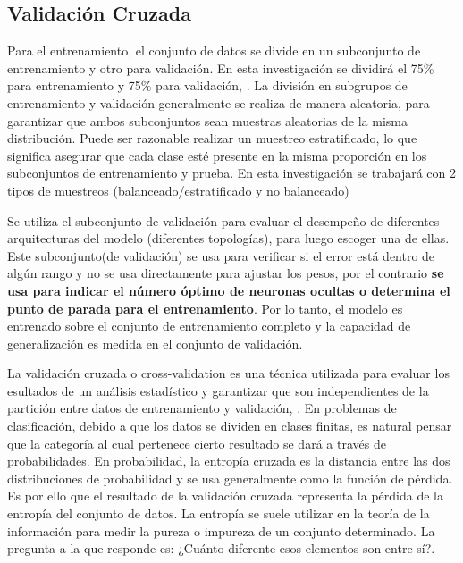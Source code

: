 	\subsection{Validación Cruzada}
	

		Para el entrenamiento, el conjunto de datos se divide en un subconjunto de entrenamiento y otro para validación. En esta investigación se dividirá el 75\% para entrenamiento y 75\% para validación, {\citep {Elkan12evaluatingclassifiers}}. La división en subgrupos de entrenamiento y validación generalmente se realiza de manera aleatoria, para garantizar que ambos subconjuntos sean muestras aleatorias de la misma distribución. Puede ser razonable realizar un muestreo estratificado, lo que significa asegurar que cada clase esté presente en la misma proporción en los subconjuntos de entrenamiento y prueba. En esta investigación se trabajará con 2 tipos de muestreos (balanceado/estratificado y no balanceado)

		Se utiliza el subconjunto de validación para evaluar el desempeño de diferentes arquitecturas del modelo (diferentes topologías), para luego escoger una de ellas. Este subconjunto(de validación) se usa para verificar si el error está dentro de algún rango y no se usa directamente para ajustar los pesos, por el contrario \textbf{se usa para indicar el número óptimo de neuronas ocultas o determina el punto de parada para el entrenamiento}.  Por lo tanto, el modelo es entrenado sobre el conjunto de entrenamiento completo y la capacidad de generalización es medida en el conjunto de validación. 

		La validación cruzada o cross-validation es una técnica utilizada para evaluar los esultados de un análisis estadístico y garantizar que son independientes de la partición entre datos de entrenamiento y validación, \citep{moore2001cross}. En problemas de clasificación, debido a que los datos se dividen en clases finitas, es natural pensar que la categoría al cual pertenece cierto resultado se dará a través de probabilidades. En probabilidad, la entropía cruzada es la distancia entre las dos distribuciones de probabilidad y se usa generalmente como la función de pérdida. Es por ello que el resultado de la validación cruzada representa la pérdida de la entropía del conjunto de datos. La entropía se suele utilizar en la teoría de la información para medir la pureza o impureza de un conjunto determinado. La pregunta a la que responde es: ¿Cuánto diferente esos elementos son entre sí?.  

